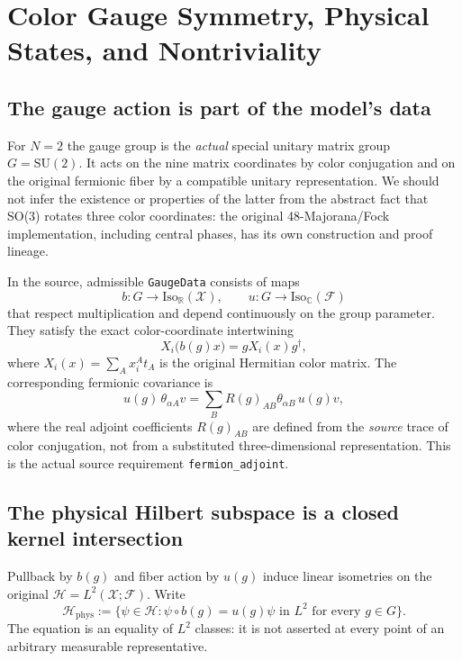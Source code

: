 \chapter[Gauge Symmetry and Physical Hilbert Space]{Color Gauge Symmetry, Physical States, and Nontriviality}
\label{ch:gauge}

\section{The gauge action is part of the model's data}
For $N=2$ the gauge group is the \emph{actual} special unitary matrix
group $G=\mathrm{SU}(2)$. It acts on the nine matrix coordinates by color
conjugation and on the original fermionic fiber by a compatible unitary
representation. We should not infer the existence or properties of the
latter from the abstract fact that SO(3) rotates three color coordinates:
the original 48-Majorana/Fock implementation, including central phases,
has its own construction and proof lineage.

In the source, admissible \texttt{GaugeData} consists of maps
\begin{equation}\label{eq:gauge-actions}
 b:G\longrightarrow\mathrm{Iso}_{\mathbb R}(\mathcal X),\qquad
 u:G\longrightarrow\mathrm{Iso}_{\mathbb C}(\mathcal F)
\end{equation}
that respect multiplication and depend continuously on the group
parameter. They satisfy the exact color-coordinate intertwining
\begin{equation}\label{eq:boson-adjoint}
 X_i\bigl(b(g)x\bigr)=gX_i(x)g^{\dagger},
\end{equation}
where $X_i(x)=\sum_A x_i^A t_A$ is the original Hermitian color matrix.
The corresponding fermionic covariance is
\begin{equation}\label{eq:fermion-gauge-covariance}
 u(g)\,\theta_{\alpha A} v
 =\sum_B R(g)_{AB}\theta_{\alpha B}\,u(g)v,
\end{equation}
where the real adjoint coefficients $R(g)_{AB}$ are defined from the
\emph{source} trace of color conjugation, not from a substituted
three-dimensional representation. This is the actual source requirement
\texttt{fermion\_adjoint}.

\section{The physical Hilbert subspace is a closed kernel intersection}
Pullback by $b(g)$ and fiber action by $u(g)$ induce linear isometries
on the original $\mathscr H=L^2(\mathcal X;\mathcal F)$. Write
\begin{equation}\label{eq:physical-condition}
 \mathscr H_{\mathrm{phys}}
 :=\bigl\{\psi\in\mathscr H:
 \psi\circ b(g)=u(g)\psi\text{ in }L^2
 \text{ for every }g\in G\bigr\}.
\end{equation}
The equation is an equality of $L^2$ classes: it is not asserted at every
point of an arbitrary measurable representative.

